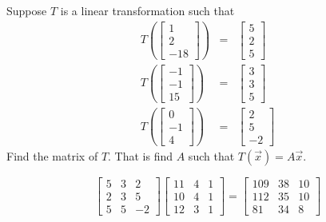 \documentclass{ximera}
\begin{document}
\begin{problem}\label{prb:10.71} Suppose $T$ is a linear transformation such that
\begin{eqnarray*}
T\left(\left[
\begin{array}{r}
1 \\
2 \\
-18
\end{array}
\right]\right) &=&\left[
\begin{array}{r}
5 \\
2 \\
5
\end{array}
\right] \\
T\left(\left[
\begin{array}{r}
-1 \\
-1 \\
15
\end{array}
\right]\right) &=&\left[
\begin{array}{r}
3 \\
3 \\
5
\end{array}
\right] \\
T\left(\left[
\begin{array}{r}
0 \\
-1 \\
4
\end{array}
\right]\right) &=&\left[
\begin{array}{r}
2 \\
5 \\
-2
\end{array}
\right]
\end{eqnarray*}
Find the matrix of $T$. That is find $A$ such that $T(\vec{x})=A\vec{x}$. \vspace{1mm}
\begin{hint}
\[
\left[
\begin{array}{rrr}
5 & 3 & 2 \\
2 & 3 & 5 \\
5 & 5 & -2
\end{array}
\right] \left[
\begin{array}{ccc}
11 & 4 & 1 \\
10 & 4 & 1 \\
12 & 3 & 1
\end{array}
\right] =\left[
\begin{array}{ccc}
109 & 38 & 10 \\
112 & 35 & 10 \\
81 & 34 & 8
\end{array}
\right]
\]
\end{hint}
\end{problem}
\end{document}
